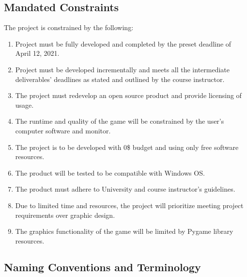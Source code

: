 \documentclass[12pt, titlepage]{article}
\begin{document}
\subsection{Mandated Constraints}

The project is constrained by the following:
\begin{enumerate}
    \item Project must be fully developed and completed by the preset deadline of April 12, 2021.
    \item Project must be developed incrementally and meets all the intermediate deliverables' deadlines as stated and outlined by the course instructor. 
    \item The project must redevelop an open source product and provide licensing of usage. 
    \item The runtime and quality of the game will be constrained by the user's computer software and monitor.
    \item The project is to be developed with 0\$ budget and using only free software resources.
    \item The product will be tested to be compatible with Windows OS. 
    \item The product must adhere to University and course instructor's guidelines. 
    \item Due to limited time and resources, the project will prioritize meeting project requirements over graphic design. 
    \item The graphics functionality of the game will be limited by Pygame library resources. 
\end{enumerate}

\subsection{Naming Conventions and Terminology}
\end{document}
